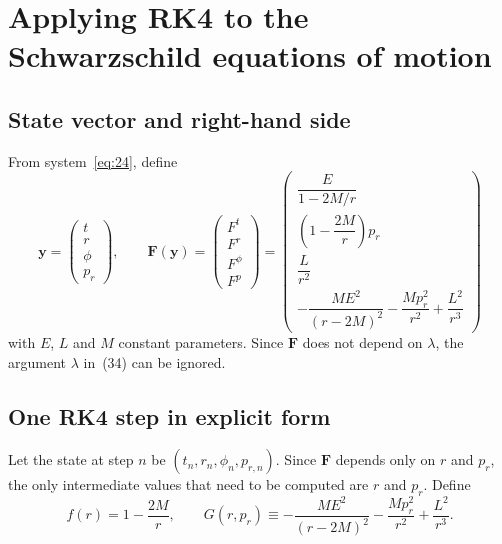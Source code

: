 \documentclass[11pt,a4paper]{article}
\begin{document}
\section{Applying RK4 to the Schwarzschild equations of motion}

\subsection{State vector and right-hand side}

From system~\eqref{eq:24}, define
\begin{equation*}
\mathbf{y} = \begin{pmatrix} t \\ r \\ \phi \\ p_r \end{pmatrix}, \qquad
\mathbf{F}(\mathbf{y}) = \begin{pmatrix}
    F^t \\ F^r \\ F^\phi \\ F^{p}
\end{pmatrix} = \begin{pmatrix}
    \dfrac{E}{1 - 2M/r} \\[8pt]
    \left(1 - \dfrac{2M}{r}\right) p_r \\[8pt]
    \dfrac{L}{r^2} \\[8pt]
    -\dfrac{ME^2}{(r-2M)^2} - \dfrac{M p_r^2}{r^2} + \dfrac{L^2}{r^3}
\end{pmatrix} \tag{35}\label{eq:35}
\end{equation*}
with $E$, $L$ and $M$ constant parameters. Since $\mathbf{F}$ does not depend on $\lambda$, the argument $\lambda$ in~(34) can be ignored.

\subsection{One RK4 step in explicit form}
\label{sec:rk4explicit}

Let the state at step $n$ be $(t_n, r_n, \phi_n, p_{r,n})$. Since $\mathbf{F}$ depends only on $r$ and $p_r$, the only intermediate values that need to be computed are $r$ and $p_r$. Define
\begin{equation*}
f(r) = 1 - \frac{2M}{r}, \qquad G(r, p_r) \equiv -\frac{ME^2}{(r-2M)^2} - \frac{M p_r^2}{r^2} + \frac{L^2}{r^3}.
\end{equation*}
\end{document}
